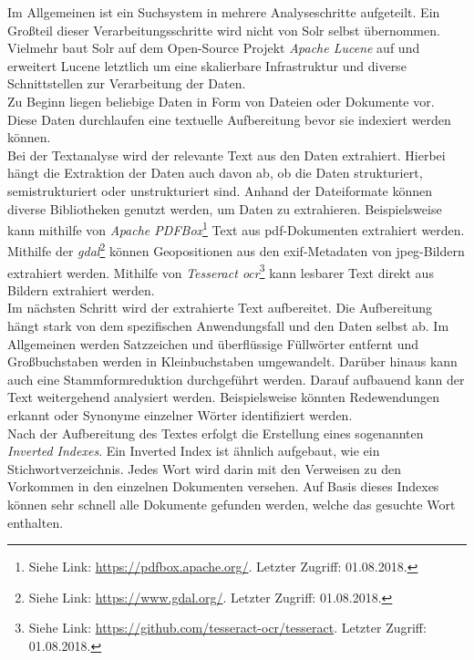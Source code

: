 \noindent
Im Allgemeinen ist ein Suchsystem in mehrere Analyseschritte aufgeteilt. Ein Großteil dieser Verarbeitungsschritte wird nicht von Solr selbst übernommen. Vielmehr baut Solr auf dem Open-Source Projekt \textit{Apache Lucene\texttrademark\thinspace} auf und erweitert Lucene letztlich um eine skalierbare Infrastruktur und diverse Schnittstellen zur Verarbeitung der Daten.\\
Zu Beginn liegen beliebige Daten in Form von Dateien oder Dokumente vor. Diese Daten durchlaufen eine textuelle Aufbereitung bevor sie indexiert werden können.\\ 
Bei der Textanalyse wird der relevante Text aus den Daten extrahiert. Hierbei hängt die Extraktion der Daten auch davon ab, ob die Daten strukturiert, semistrukturiert oder unstrukturiert sind. Anhand der Dateiformate können diverse Bibliotheken genutzt werden, um Daten zu extrahieren. Beispielsweise kann mithilfe von \textit{Apache PDFBox\textsuperscript{\textregistered}}\footnote{Siehe Link: \url{https://pdfbox.apache.org/}. Letzter Zugriff: 01.08.2018.} Text aus \acrshort{pdf}-Dokumenten extrahiert werden. Mithilfe der \textit{\gls{gdal}}\footnote{Siehe Link: \url{https://www.gdal.org/}. Letzter Zugriff: 01.08.2018.} können Geopositionen aus den \acrshort{exif}-Metadaten von \acrshort{jpeg}-Bildern extrahiert werden. Mithilfe von \textit{Tesseract \acrshort{ocr}}\footnote{Siehe Link: \url{https://github.com/tesseract-ocr/tesseract}. Letzter Zugriff: 01.08.2018.} kann lesbarer Text direkt aus Bildern extrahiert werden.\cite[S. 39]{solr_search}\\

\noindent
Im nächsten Schritt wird der extrahierte Text aufbereitet. Die Aufbereitung hängt stark von dem spezifischen Anwendungsfall und den Daten selbst ab. Im Allgemeinen werden Satzzeichen und überflüssige Füllwörter entfernt und Großbuchstaben werden in Kleinbuchstaben umgewandelt. Darüber hinaus kann auch eine Stammformreduktion durchgeführt werden. Darauf aufbauend kann der Text weitergehend analysiert werden. Beispielsweise könnten Redewendungen erkannt oder Synonyme einzelner Wörter identifiziert werden.\cite[S.44]{solr_search}\\

\noindent
Nach der Aufbereitung des Textes erfolgt die Erstellung eines sogenannten \textit{Inverted Indexes}. Ein Inverted Index ist ähnlich aufgebaut, wie ein Stichwortverzeichnis. Jedes Wort wird darin mit den Verweisen zu den Vorkommen in den einzelnen Dokumenten versehen. Auf Basis dieses Indexes können sehr schnell alle Dokumente gefunden werden, welche das gesuchte Wort enthalten.\cite[S. 47]{solr_search}\\

